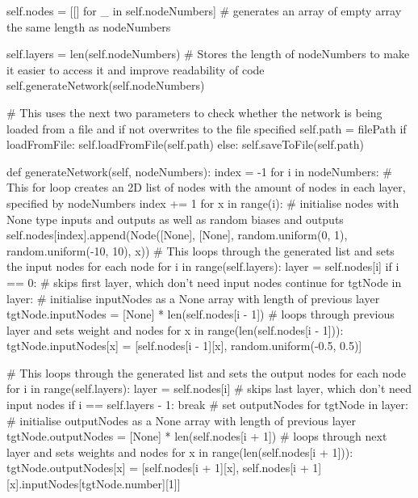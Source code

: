 \documentclass{report}
\begin{document}
\begin{python}
        self.nodes = [[] for _ in self.nodeNumbers]  # generates an array of empty array the same length as nodeNumbers

        self.layers = len(self.nodeNumbers)  # Stores the length of nodeNumbers to make it easier to access it and improve readability of code
        self.generateNetwork(self.nodeNumbers)

        # This uses the next two parameters to check whether the network is being loaded from a file and if not overwrites to the file specified
        self.path = filePath
        if loadFromFile:
            self.loadFromFile(self.path)
        else:
            self.saveToFile(self.path)

    def generateNetwork(self, nodeNumbers):
        index = -1
        for i in nodeNumbers:  # This for loop creates an 2D list of nodes with the amount of nodes in each layer, specified by nodeNumbers
            index += 1
            for x in range(i):
                # initialise nodes with None type inputs and outputs as well as random biases and outputs
                self.nodes[index].append(Node([None], [None],
                                              random.uniform(0, 1),
                                              random.uniform(-10, 10), x))
        # This loops through the generated list and sets the input nodes for each node
        for i in range(self.layers):
            layer = self.nodes[i]
            if i == 0:  # skips first layer, which don't need input nodes
                continue
            for tgtNode in layer:
                # initialise inputNodes as a None array with length of previous layer
                tgtNode.inputNodes = [None] * len(self.nodes[i - 1])
                # loops through previous layer and sets weight and nodes
                for x in range(len(self.nodes[i - 1])):
                    tgtNode.inputNodes[x] = [self.nodes[i - 1][x], random.uniform(-0.5, 0.5)]

        # This loops through the generated list and sets the output nodes for each node
        for i in range(self.layers):
            layer = self.nodes[i]
            # skips last layer, which don't need input nodes
            if i == self.layers - 1:
                break
            # set outputNodes
            for tgtNode in layer:
                # initialise outputNodes as a None array with length of previous layer
                tgtNode.outputNodes = [None] * len(self.nodes[i + 1])
                # loops through next layer and sets weights and nodes
                for x in range(len(self.nodes[i + 1])):
                    tgtNode.outputNodes[x] = [self.nodes[i + 1][x], self.nodes[i + 1][x].inputNodes[tgtNode.number][1]]


\end{python}
\end{document}
